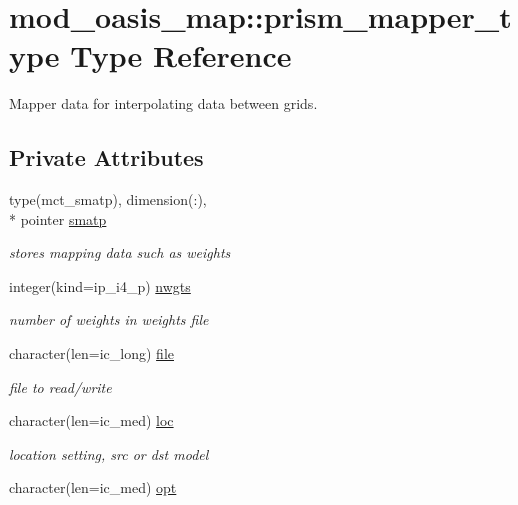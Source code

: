 \hypertarget{structmod__oasis__map_1_1prism__mapper__type}{\section{mod\+\_\+oasis\+\_\+map\+:\+:prism\+\_\+mapper\+\_\+type Type Reference}
\label{structmod__oasis__map_1_1prism__mapper__type}
}


Mapper data for interpolating data between grids.  


\subsection*{Private Attributes}
\begin{DoxyCompactItemize}
\item 
type(mct\+\_\+smatp), dimension(\+:), \\*
pointer \hyperlink{structmod__oasis__map_1_1prism__mapper__type_a46e59a2d0c41fc11532e14ef413522f1}{smatp}
\begin{DoxyCompactList}\small\item\em stores mapping data such as weights \end{DoxyCompactList}\item 
integer(kind=ip\+\_\+i4\+\_\+p) \hyperlink{structmod__oasis__map_1_1prism__mapper__type_a90bcd6831549c027de72dbba1daa0939}{nwgts}
\begin{DoxyCompactList}\small\item\em number of weights in weights file \end{DoxyCompactList}\item 
character(len=ic\+\_\+long) \hyperlink{structmod__oasis__map_1_1prism__mapper__type_a10ad0d8412afdfa993728ac63e117e9e}{file}
\begin{DoxyCompactList}\small\item\em file to read/write \end{DoxyCompactList}\item 
character(len=ic\+\_\+med) \hyperlink{structmod__oasis__map_1_1prism__mapper__type_a37a969cc8b9d9234e6e99c6d3ef144ad}{loc}
\begin{DoxyCompactList}\small\item\em location setting, src or dst model \end{DoxyCompactList}\item 
character(len=ic\+\_\+med) \hyperlink{structmod__oasis__map_1_1prism__mapper__type_a3b10832f360b8f2061807dfdec6be493}{opt}

\end{DoxyCompactItemize}
